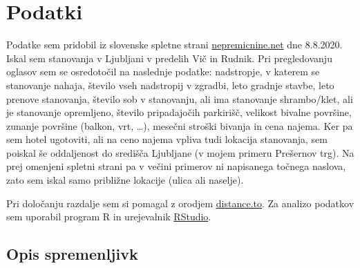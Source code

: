 \documentclass[a4paper, 12pt]{article}
\begin{document}
\section{Podatki}

Podatke sem pridobil iz slovenske spletne strani
\href{https://www.nepremicnine.net}{nepremicnine.net} dne 8.8.2020.
Iskal sem stanovanja v Ljubljani v predelih Vič in Rudnik.
Pri pregledovanju oglasov sem se osredotočil na naslednje podatke:
nadstropje, v katerem se stanovanje nahaja, število vseh nadstropij v zgradbi,
leto gradnje stavbe, leto prenove stanovanja, število sob v stanovanju,
ali ima stanovanje shrambo/klet, ali je stanovanje opremljeno, število
pripadajočih parkirišč, velikost bivalne površine, zunanje površine
(balkon, vrt, \dots), mesečni stroški bivanja in cena najema. Ker pa sem hotel
ugotoviti, ali na ceno najema vpliva tudi lokacija stanovanja, sem poiskal še
oddaljenost do središča Ljubljane (v mojem primeru Prešernov trg). Na prej
omenjeni spletni strani pa v večini primerov ni napisanega točnega naslova,
zato sem iskal samo približne lokacije (ulica ali naselje).

Pri določanju razdalje sem si pomagal z orodjem
\href{https://www.distance.to/}{distance.to}. Za analizo podatkov sem uporabil
program R in urejevalnik \href{https://rstudio.com/}{RStudio}.

\subsection{Opis spremenljivk}
\end{document}
